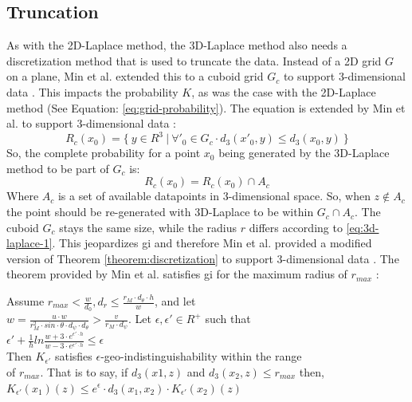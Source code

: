 \newpage
\subsection{Truncation}
As with the 2D-Laplace method, the 3D-Laplace method also needs a discretization method that is used to truncate the data.
Instead of a 2D grid $G$ on a plane, Min et al. extended this to a cuboid grid $G_c$ to support 3-dimensional data \citep{9646489}.
This impacts the probability $K$, as was the case with the 2D-Laplace method (See Equation: \ref{eq:grid-probability}).
The equation is extended by Min et al. to support 3-dimensional data \citep{9646489}:
\begin{equation}
  R_c(x_0) = \{ \ y \in R^3 \ | \ \forall'_{0} \in G_c \cdot d_3(x'_{0}, y) \leq d_3(x_0, y) \ \}
  \label{eq:3d-grid-probability}
\end{equation}
So, the complete probability for a point $x_0$ being generated by the 3D-Laplace method to be part of $G_c$ is:
\begin{equation}
  R_c(x_0) = R_c(x_0) \cap A_c
  \label{eq:3d-grid-probability-2}
\end{equation}
Where $A_c$ is a set of available datapoints in 3-dimensional space. So, when $z \notin A_c$ the point should be re-generated with 3D-Laplace to be within $G_c \cap A_c$.
The cuboid $G_c$ stays the same size, while the radius $r$ differs according to \ref{eq:3d-laplace-1}.
This jeopardizes \gls{gi} and therefore Min et al. provided a modified version of Theorem \ref{theorem:discretization} to support 3-dimensional data \citep{9646489}.
The theorem provided by Min et al. satisfies \gls{gi} for the maximum radius of $r_{max}$ \citep{9646489}:
\begin{theorem}
  Assume $r_{max} < \frac{w}{d_0}, d_r \leq \frac{r_M \cdot d_\theta \cdot h}{w}$, and let \\
  $w = \frac{u \cdot w}{r^2_M \cdot sin \cdot \theta \cdot d_\psi \cdot d_\theta} > \frac{v}{r_M \cdot d_\psi}$. Let $\epsilon, \epsilon' \in R^+$ such that \\
  $\epsilon' + \frac{1}{h} ln \frac{w + 3 \cdot e^{\epsilon' \cdot h}}{w - 3 \cdot e^{\epsilon' \cdot h}} \leq \epsilon$ \\
  Then $K_{\epsilon'}$ satisfies $\epsilon$-geo-indistinguishability within the range \\
  of $r_{max}$. That is to say, if $d_3(x1, z)$ and $d_3(x_2, z) \leq r_{max}$ then, \\
  $K_{\epsilon'}(x_1)(z) \leq e^\epsilon \cdot d_3(x_1, x_2) \cdot K_{\epsilon'}(x_2)(z)$
  \label{theorem:3d-discretization}
\end{theorem}
